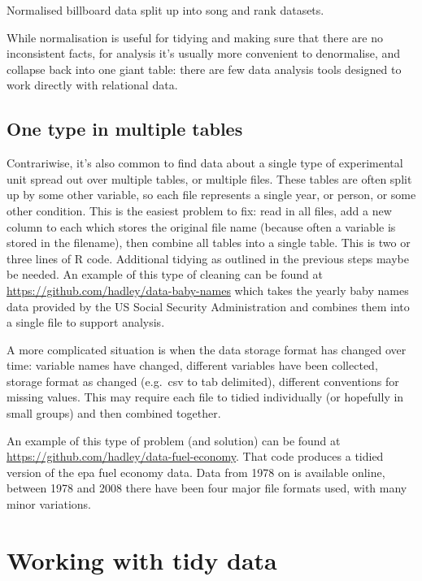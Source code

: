 \documentclass[oneside]{article}
\begin{document}
\begin{table}
  \centering
  
  

  \caption{Normalised billboard data split up into song and rank datasets.}
  \label{tbl:billboard-normal}
\end{table}

While normalisation is useful for tidying and making sure that there are no inconsistent facts, for analysis it's usually more convenient to denormalise, and collapse back into one giant table: there are few data analysis tools designed to work directly with relational data.

\subsection{One type in multiple tables}

Contrariwise, it's also common to find data about a single type of experimental unit spread out over multiple tables, or multiple files. These tables are often split up by some other variable, so each file represents a single year, or person, or some other condition. This is the easiest problem to fix: read in all files, add a new column to each which stores the original file name (because often a variable is stored in the filename), then combine all tables into a single table. This is two or three lines of R code. Additional tidying as outlined in the previous steps maybe be needed.  An example of this type of cleaning can be found at \url{https://github.com/hadley/data-baby-names} which takes the yearly baby names data provided by the US Social Security Administration and combines them into a single file to support analysis.

A more complicated situation is when the data storage format has changed over time: variable names have changed, different variables have been collected, storage format as changed (e.g.\ csv to tab delimited), different conventions for missing values. This may require each file to tidied individually (or hopefully in small groups) and then combined together. 

An example of this type of problem (and solution) can be found at \url{https://github.com/hadley/data-fuel-economy}. That code produces a tidied version of the {\sc epa} fuel economy data. Data from 1978 on is available online, between 1978 and 2008 there have been four major file formats used, with many minor variations.

\section{Working with tidy data}
\end{document}
